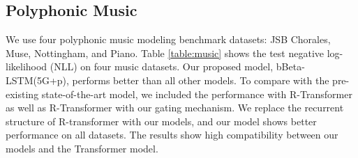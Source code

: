 \documentclass[letterpaper]{article} %
\begin{document}
\subsection{Polyphonic Music}
We use four polyphonic music modeling benchmark datasets: JSB Chorales, Muse, Nottingham, and Piano. Table \ref{table:music} shows the test negative log-likelihood (NLL) on four music datasets.
Our proposed model, bBeta-LSTM(5G+p), performs better than all other models.
To compare with the pre-existing state-of-the-art model, we included the performance with R-Transformer \cite{wang2019rtransf} as well as R-Transformer with our gating mechanism. We replace the recurrent structure of R-transformer with our models, and our model shows better performance on all datasets. The results show high compatibility between our models and the Transformer model.
\end{document}
